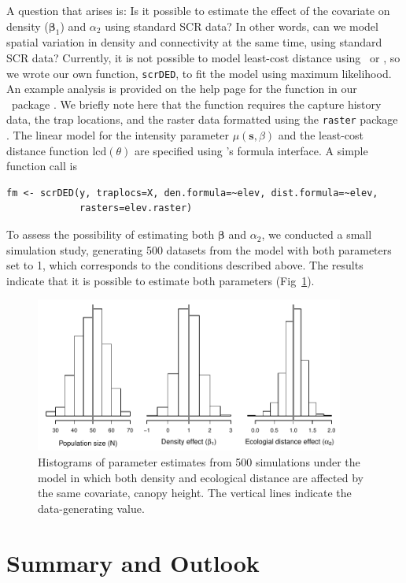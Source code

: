 A question that arises is: Is it possible to estimate the effect of
the covariate on density ($\bm \beta_1$)
and $\alpha_2$ using standard SCR data? In other words, can we model
spatial variation in density and connectivity at the same time,
using standard SCR data? Currently, it is not possible to
model least-cost distance using \jags~or \secr, so we wrote our own
function, \verb+scrDED+, to fit the model using maximum likelihood. An
example analysis is provided on the help page for the function in our
\R~package \scrbook. We briefly note here that the function requires
the capture history data, the trap locations, and the raster data
formatted using the {\tt raster} package
\citep{hijmans_vanetten:2012}. The linear model for the
intensity parameter $\mu(\mathbf{s}, \beta)$ and the least-cost distance
function $\text{lcd}(\theta)$ are specified using \R's formula interface. A
simple function call is
\begin{verbatim}
fm <- scrDED(y, traplocs=X, den.formula=~elev, dist.formula=~elev,
             rasters=elev.raster)
\end{verbatim}
To assess the possibility of estimating both $\bm \beta$ and $\alpha_2$, we
conducted a small simulation study, generating 500 datasets from the
model with both parameters set to 1, which corresponds to the
conditions described above. The results indicate that it is
possible to estimate both parameters
(Fig~\ref{chapt.ecoldist.fig.simDED}).

\begin{figure}[ht]
\centering
\includegraphics[width=4in,height=2in]{Ch12-EcolDist/figs/scrDEDsim}
\caption{Histograms of parameter estimates from 500 simulations under
  the model in which both density and ecological distance are affected
by the same covariate, canopy height. The vertical lines indicate the
data-generating value.}
\label{chapt.ecoldist.fig.simDED}
\end{figure}



\section{Summary and Outlook}


